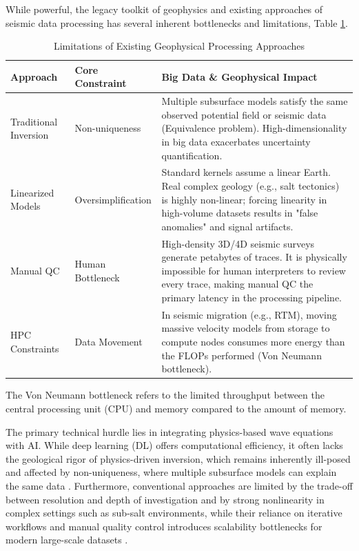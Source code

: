 \documentclass[data,article,submit,pdftex,moreauthors]{Definitions/mdpi}
\begin{document}
While powerful, the legacy toolkit of geophysics and existing approaches of seismic data processing has several inherent bottlenecks and limitations, Table \ref{tab01}.

\begin{table}[ht]
\centering
\begin{threeparttable}
\caption{Limitations of Existing Geophysical Processing Approaches}
\label{tab01}
\begin{tabularx}{\textwidth}{@{} l l X @{}}
\toprule
\textbf{Approach} & \textbf{Core Constraint} & \textbf{Big Data \& Geophysical Impact} \\ \midrule
Traditional Inversion & Non-uniqueness & Multiple subsurface models satisfy the same observed potential field or seismic data (Equivalence problem). High-dimensionality in big data exacerbates uncertainty quantification. \\ \addlinespace
Linearized Models & Oversimplification & Standard kernels assume a linear Earth. Real complex geology (e.g., salt tectonics) is highly non-linear; forcing linearity in high-volume datasets results in "false anomalies" and signal artifacts. \\ \addlinespace
Manual QC & Human Bottleneck & High-density 3D/4D seismic surveys generate petabytes of traces. It is physically impossible for human interpreters to review every trace, making manual QC the primary latency in the processing pipeline. \\ \addlinespace
HPC Constraints & Data Movement & In seismic migration (e.g., RTM), moving massive velocity models from storage to compute nodes consumes more energy than the FLOPs performed (Von Neumann bottleneck\tnote{1}). \\ \bottomrule
\end{tabularx}
\begin{tablenotes}
\small
\item[1] The Von Neumann bottleneck refers to the limited throughput between the central processing unit (CPU) and memory compared to the amount of memory.
\end{tablenotes}
\end{threeparttable}
\end{table}

The primary technical hurdle lies in integrating physics-based wave equations with AI. While deep learning (DL) offers computational efficiency, it often lacks the geological rigor of physics-driven inversion, which remains inherently ill-posed and affected by non-uniqueness, where multiple subsurface models can explain the same data \cite{Li2019}. Furthermore, conventional approaches are limited by the trade-off between resolution and depth of investigation and by strong nonlinearity in complex settings such as sub-salt environments, while their reliance on iterative workflows and manual quality control introduces scalability bottlenecks for modern large-scale datasets \cite{Brossier2015}.
\end{document}
